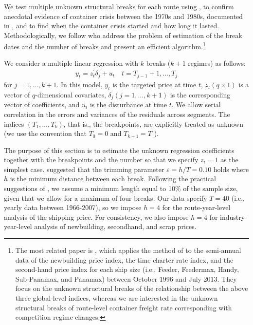 \documentclass[11pt]{article}
\begin{document}
We test multiple unknown structural breaks for each route using \cite{bai1998estimating,bai2003computation}, to confirm anecdotal evidence of container crisis between the 1970s and 1980s, documented in \cite{broeze2002globalisation}, and to find when the container crisis started and how long it lasted. Methodologically, we follow \cite{bai2003computation} who address the problem of estimation of the break dates and the number of breaks and present an efficient algorithm.\footnote{The most related paper is \cite{fan2016analysis}, which applies the method of \cite{bai2003computation} to the semi-annual data of the newbuilding price index, the time charter rate index, and the second-hand price index for each ship size (i.e., Feeder, Feedermax, Handy, Sub-Panamax, and Panamax) between October 1996 and July 2013. They focus on the unknown structural breaks of the relationship between the above three global-level indices, whereas we are interested in the unknown structural breaks of route-level container freight rate corresponding with competition regime changes.} 

We consider a multiple linear regression with $k$ breaks ($k + 1$ regimes) as follows:
\begin{align}
    y_{t}=z_{t}^{\prime} \delta_{j}+u_{t} \quad t=T_{j-1}+1, \ldots, T_{j}\label{eq:bai_and_perron}
\end{align}
for $j=1, \ldots, k+1$. In this model, $y_{t}$ is the targeted price at time $t$, $z_{t}(q \times 1)$ is a vector of $q$-dimensional covariates, $\delta_{j}(j=1, \ldots, k+1)$ is the corresponding vector of coefficients, and $u_{t}$ is the disturbance at time $t$. We allow serial correlation in the errors and variances of the residuals across segments. The indices $\left(T_{1}, \ldots, T_{k}\right)$, that is., the breakpoints, are explicitly treated as unknown (we use the convention that $T_{0}=0$ and $T_{k+1}=T$ ). 

The purpose of this section is to estimate the unknown regression coefficients together with the breakpoints and the number so that we specify $z_{t}=1$ as the simplest case. \cite{bai2003computation} suggested that the trimming parameter $\varepsilon=h/T=0.10$ holds where $h$ is the minimum distance between each break. Following the practical suggestions of \cite{bai2003computation}, we assume a minimum length equal to 10\% of the sample size, given that we allow for a maximum of four breaks. Our data specify $T=40$ (i.e., yearly data between 1966-2007), so we impose $h=4$ for the route-year-level analysis of the shipping price. For consistency, we also impose $h=4$ for industry-year-level analysis of newbuilding, secondhand, and scrap prices.
\end{document}
